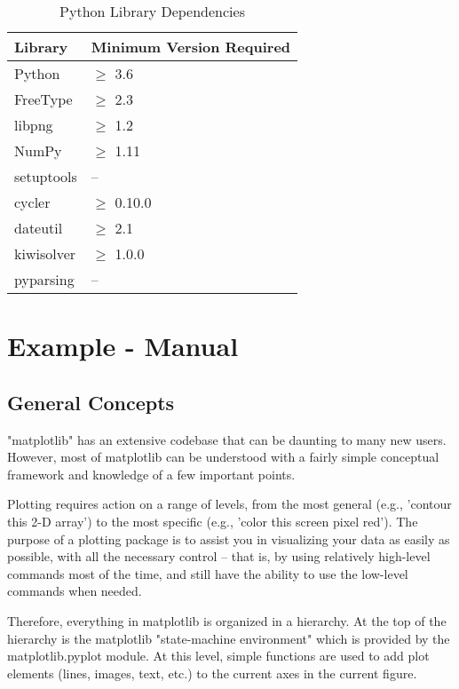 \begin{table}[htbp]
	\centering
	\caption{Python Library Dependencies}
	\label{tab:dependencies}
	\begin{tabular}{|l|l|}
		\hline
		\textbf{Library} & \textbf{Minimum Version Required} \\
		\hline
		Python & $\geq$ 3.6 \\
		FreeType & $\geq$ 2.3 \\
		libpng & $\geq$ 1.2 \\
		NumPy & $\geq$ 1.11 \\
		setuptools & -- \\
		cycler & $\geq$ 0.10.0 \\
		dateutil & $\geq$ 2.1 \\
		kiwisolver & $\geq$ 1.0.0 \\
		pyparsing & -- \\
		\hline
	\end{tabular}
\end{table}


\section{Example - Manual}

\subsection{General Concepts}

"matplotlib" has an extensive codebase that can be daunting to many new users. However, most of matplotlib can be understood with a fairly simple conceptual framework and knowledge of a few important points.

Plotting requires action on a range of levels, from the most general (e.g., 'contour this 2-D array') to the most specific (e.g., 'color this screen pixel red'). The purpose of a plotting package is to assist you in visualizing your data as easily as possible, with all the necessary control -- that is, by using relatively high-level commands most of the time, and still have the ability to use the low-level commands when needed.

Therefore, everything in matplotlib is organized in a hierarchy. At the top of the hierarchy is the matplotlib "state-machine environment" which is provided by the matplotlib.pyplot module. At this level, simple functions are used to add plot elements (lines, images, text, etc.) to the current axes in the current figure.

